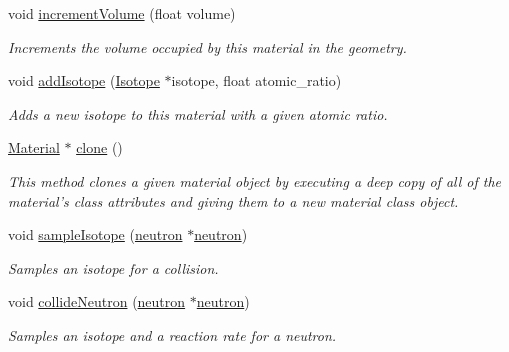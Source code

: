 \begin{DoxyCompactItemize}
void \hyperlink{classMaterial_affdd4a5887ae6cfb3772c7ebe6181a57}{increment\-Volume} (float volume)
\begin{DoxyCompactList}\small\item\em Increments the volume occupied by this material in the geometry. \end{DoxyCompactList}\item 
void \hyperlink{classMaterial_a397c579dfabdd309348de2b5875f74f9}{add\-Isotope} (\hyperlink{classIsotope}{Isotope} $\ast$isotope, float atomic\-\_\-ratio)
\begin{DoxyCompactList}\small\item\em Adds a new isotope to this material with a given atomic ratio. \end{DoxyCompactList}\item 
\hyperlink{classMaterial}{Material} $\ast$ \hyperlink{classMaterial_a417cf6f7c2cc82c04599e5a29b620a64}{clone} ()
\begin{DoxyCompactList}\small\item\em This method clones a given material object by executing a deep copy of all of the material's class attributes and giving them to a new material class object. \end{DoxyCompactList}\item 
void \hyperlink{classMaterial_a45bc347522e5f10ffdf05e0c6a68001f}{sample\-Isotope} (\hyperlink{structneutron}{neutron} $\ast$\hyperlink{structneutron}{neutron})
\begin{DoxyCompactList}\small\item\em Samples an isotope for a collision. \end{DoxyCompactList}\item 
void \hyperlink{classMaterial_a3edcd9cac4f7e663499c4f6645aefa8c}{collide\-Neutron} (\hyperlink{structneutron}{neutron} $\ast$\hyperlink{structneutron}{neutron})
\begin{DoxyCompactList}\small\item\em Samples an isotope and a reaction rate for a neutron. \end{DoxyCompactList}\end{DoxyCompactItemize}

